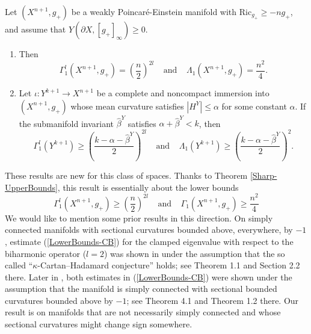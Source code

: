 \documentclass{amsart}
\newcommand{\Ric}{\text{Ric}}
\begin{document}
\begin{theorem}\label{Sharp-LowerBounds-Clamped&Buckling}
   Let $(X^{n+1},g_+)$ be a weakly Poincar\'e-Einstein manifold with $\Ric_{g_+}\ge -ng_+$, and assume that $Y(\partial X, [g_+]_\infty)\ge 0$.
   \begin{enumerate}
   \item Then 
   \begin{equation}
   \Gamma^l_1(X^{n+1},g_+) = \left(\frac{n}{2}\right)^{2l}\;\;\;\;\text{and}\;\;\;\; \Lambda_1(X^{n+1},g_+)=\frac{n^2}{4}.
   \end{equation}
   \item Let $\iota: Y^{k+1}\to X^{n+1}$ be a complete and noncompact immersion into $(X^{n+1},g_+)$ whose mean curvature satisfies $|H^Y|\le \alpha$ for some constant $\alpha$. If the submanifold invariant $\hat \beta^Y$ satisfies $\alpha+\hat \beta^Y< k$, then  
   \begin{equation}\label{Sharp-LB-Clamped-Sub}
       \Gamma^l_1(Y^{k+1})\ge \left(\frac{k-\alpha - \hat \beta^Y}{2}\right)^{2l}\;\;\;\; \text{and}\;\;\;\; \Lambda_1(Y^{k+1})\ge \left(\frac{k-\alpha - \hat\beta^Y}{2}\right)^2.
   \end{equation}
   \end{enumerate}
\end{theorem}
These results are new for this class of spaces. Thanks to Theorem \ref{Sharp-UpperBounds}, this result is essentially about the lower bounds
\begin{equation}\label{LowerBounds-CB}
    \Gamma_1^l(X^{n+1},g_+)\ge \left(\frac{n}{2}\right)^{2l} \;\;\;\; \text{and}\;\;\;\; \Gamma_1(X^{n+1},g_+)\ge \frac{n^2}{4}
\end{equation}
We would like to mention some prior results in this direction. On simply connected manifolds with sectional curvatures bounded above, everywhere, by $-1$, estimate (\ref{LowerBounds-CB}) for the clamped eigenvalue with respect to the biharmonic operator ($l=2$) was shown in \cite{KristalyAlexandru2020Ftoc} under the assumption that the so called ``$\kappa$-Cartan--Hadamard conjecture'' holds; see Theorem 1.1 and Section 2.2 there. Later in  \cite{FarkasKajantoKristaly2025}, both estimates in (\ref{LowerBounds-CB}) were shown under the assumption that the manifold is simply connected with sectional bounded curvatures bounded above by $-1$; see Theorem 4.1 and Theorem 1.2 there. Our result is on manifolds that are not necessarily simply connected and whose sectional curvatures might change sign somewhere.
\end{document}
